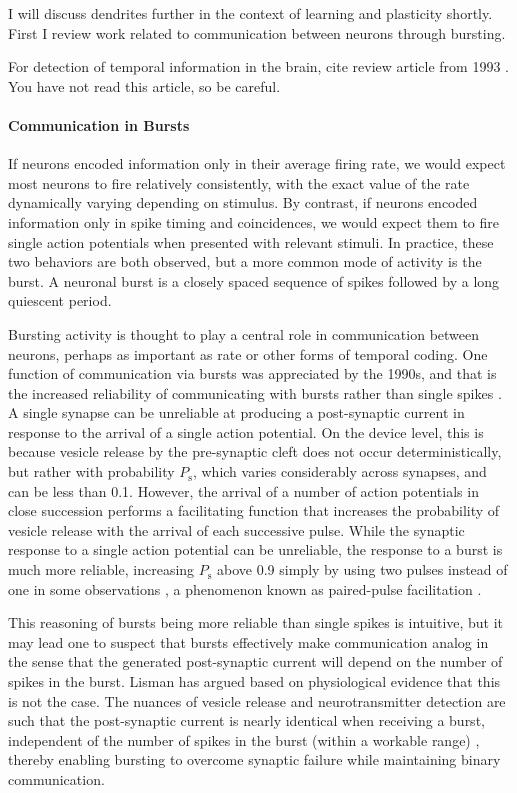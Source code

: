 I will discuss dendrites further in the context of learning and plasticity shortly. First I review work related to communication between neurons through bursting.

\vspace{3em}
For detection of temporal information in the brain, cite review article from 1993 \cite{ca1993}. You have not read this article, so be careful.

\paragraph{Communication in Bursts}
If neurons encoded information only in their average firing rate, we would expect most neurons to fire relatively consistently, with the exact value of the rate dynamically varying depending on stimulus. By contrast, if neurons encoded information only in spike timing and coincidences, we would expect them to fire single action potentials when presented with relevant stimuli. In practice, these two behaviors are both observed, but a more common mode of activity is the burst. A neuronal burst is a closely spaced sequence of spikes followed by a long quiescent period. 

Bursting activity is thought to play a central role in communication between neurons, perhaps as important as rate or other forms of temporal coding. One function of communication via bursts was appreciated by the 1990s, and that is the increased reliability of communicating with bursts rather than single spikes \cite{li1997}. A single synapse can be unreliable at producing a post-synaptic current in response to the arrival of a single action potential. On the device level, this is because vesicle release by the pre-synaptic cleft does not occur deterministically, but rather with probability $P_{\mathrm{s}}$, which varies considerably across synapses, and can be less than 0.1. However, the arrival of a number of action potentials in close succession performs a facilitating function that increases the probability of vesicle release with the arrival of each successive pulse. While the synaptic response to a single action potential can be unreliable, the response to a burst is much more reliable, increasing $P_{\mathrm{s}}$ above 0.9 simply by using two pulses instead of one in some observations \cite{fomc1991,degu1996}, a phenomenon known as paired-pulse facilitation \cite{li1997}. 

This reasoning of bursts being more reliable than single spikes is intuitive, but it may lead one to suspect that bursts effectively make communication analog in the sense that the generated post-synaptic current will depend on the number of spikes in the burst. Lisman has argued based on physiological evidence that this is not the case. The nuances of vesicle release and neurotransmitter detection are such that the post-synaptic current is nearly identical when receiving a burst, independent of the number of spikes in the burst (within a workable range) \cite{li1997}, thereby enabling bursting to overcome synaptic failure while maintaining binary communication.

